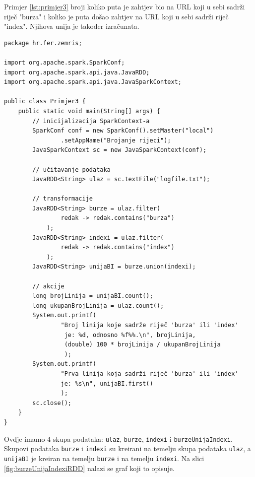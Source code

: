 \documentclass[times, utf8, zavrsni, numeric]{fer}
\begin{document}
Primjer \ref{lst:primjer3} broji koliko puta je zahtjev bio na URL koji u sebi sadrži riječ "burza" i koliko je puta došao zahtjev na URL koji u sebi sadrži riječ "index". Njihova unija je također izračunata.
 
\vspace{5mm}
\begin{lstlisting}[label={lst:primjer3}, caption={Korištenje transformacija i akcija.}]
package hr.fer.zemris;

import org.apache.spark.SparkConf;
import org.apache.spark.api.java.JavaRDD;
import org.apache.spark.api.java.JavaSparkContext;

public class Primjer3 {
	public static void main(String[] args) {
		// inicijalizacija SparkContext-a
		SparkConf conf = new SparkConf().setMaster("local")
				.setAppName("Brojanje rijeci");
		JavaSparkContext sc = new JavaSparkContext(conf);

		// učitavanje podataka
		JavaRDD<String> ulaz = sc.textFile("logfile.txt");

		// transformacije
		JavaRDD<String> burze = ulaz.filter(
				redak -> redak.contains("burza")
			);
		JavaRDD<String> indexi = ulaz.filter(
				redak -> redak.contains("index")
			);
		JavaRDD<String> unijaBI = burze.union(indexi);

		// akcije
		long brojLinija = unijaBI.count();
		long ukupanBrojLinija = ulaz.count();
		System.out.printf(
				"Broj linija koje sadrže riječ 'burza' ili 'index'
				 je: %d, odnosno %f%%.\n", brojLinija,
				 (double) 100 * brojLinija / ukupanBrojLinija
				 );
		System.out.printf(
				"Prva linija koja sadrži riječ 'burza' ili 'index'
				je: %s\n", unijaBI.first()
				);
		sc.close();
	}
}
\end{lstlisting}
\vspace{5mm}

Ovdje imamo 4 skupa podataka: \texttt{ulaz}, \texttt{burze}, \texttt{indexi} i \texttt{burzeUnijaIndexi}. Skupovi podataka \texttt{burze} i \texttt{indexi} su kreirani na temelju skupa podataka \texttt{ulaz}, a \texttt{unijaBI} je kreiran na temelju \texttt{burze} i na temelju \texttt{indexi}. Na slici \ref{fig:burzeUnijaIndexiRDD} nalazi se graf koji to opisuje.
\end{document}
